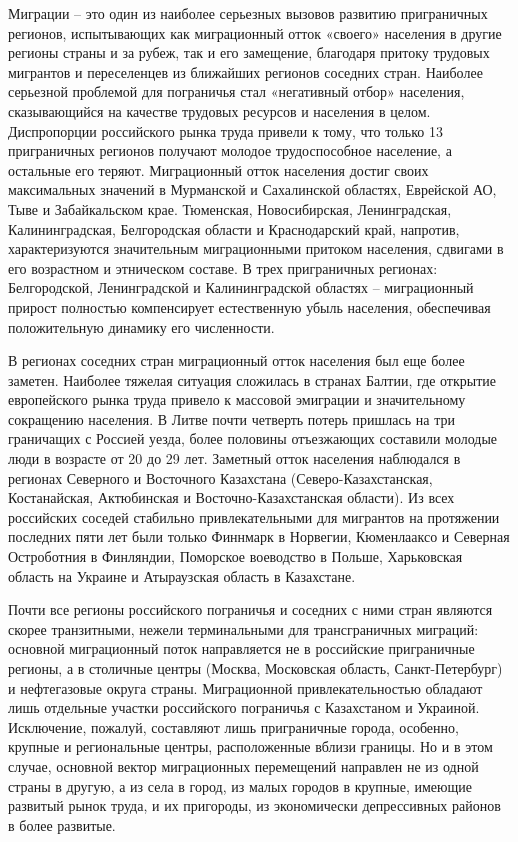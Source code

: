 \documentclass[]{book}
\begin{document}
Миграции -- это один из наиболее серьезных вызовов развитию приграничных
регионов, испытывающих как миграционный отток «своего» населения в
другие регионы страны и за рубеж, так и его замещение, благодаря притоку
трудовых мигрантов и переселенцев из ближайших регионов соседних стран.
Наиболее серьезной проблемой для пограничья стал «негативный отбор»
населения, сказывающийся на качестве трудовых ресурсов и населения в
целом. Диспропорции российского рынка труда привели к тому, что только
13 приграничных регионов получают молодое трудоспособное население, а
остальные его теряют. Миграционный отток населения достиг своих
максимальных значений в Мурманской и Сахалинской областях, Еврейской АО,
Тыве и Забайкальском крае. Тюменская, Новосибирская, Ленинградская,
Калининградская, Белгородская области и Краснодарский край, напротив,
характеризуются значительным миграционными притоком населения, сдвигами
в его возрастном и этническом составе. В трех приграничных регионах:
Белгородской, Ленинградской и Калининградской областях -- миграционный
прирост полностью компенсирует естественную убыль населения, обеспечивая
положительную динамику его численности.

В регионах соседних стран миграционный отток населения был еще более
заметен. Наиболее тяжелая ситуация сложилась в странах Балтии, где
открытие европейского рынка труда привело к массовой эмиграции и
значительному сокращению населения. В Литве почти четверть потерь
пришлась на три граничащих с Россией уезда, более половины отъезжающих
составили молодые люди в возрасте от 20 до 29 лет. Заметный отток
населения наблюдался в регионах Северного и Восточного Казахстана
(Северо-Казахстанская, Костанайская, Актюбинская и
Восточно-Казахстанская области). Из всех российских соседей стабильно
привлекательными для мигрантов на протяжении последних пяти лет были
только Финнмарк в Норвегии, Кюменлааксо и Северная Остроботния в
Финляндии, Поморское воеводство в Польше, Харьковская область на Украине
и Атыраузская область в Казахстане.

Почти все регионы российского пограничья и соседних с ними стран
являются скорее транзитными, нежели терминальными для трансграничных
миграций: основной миграционный поток направляется не в российские
приграничные регионы, а в столичные центры (Москва, Московская область,
Санкт-Петербург) и нефтегазовые округа страны. Миграционной
привлекательностью обладают лишь отдельные участки российского
пограничья с Казахстаном и Украиной. Исключение, пожалуй, составляют
лишь приграничные города, особенно, крупные и региональные центры,
расположенные вблизи границы. Но и в этом случае, основной вектор
миграционных перемещений направлен не из одной страны в другую, а из
села в город, из малых городов в крупные, имеющие развитый рынок труда,
и их пригороды, из экономически депрессивных районов в более развитые.
\end{document}

